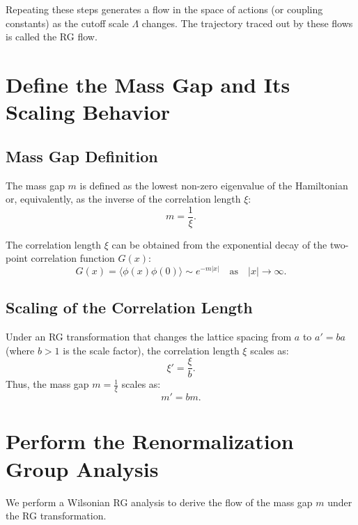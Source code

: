 Repeating these steps generates a flow in the space of actions (or coupling constants) as the cutoff scale \(\Lambda\) changes. The trajectory traced out by these flows is called the RG flow.



\section{Define the Mass Gap and Its Scaling Behavior}

\subsection{Mass Gap Definition}

The mass gap \(m\) is defined as the lowest non-zero eigenvalue of the Hamiltonian or, equivalently, as the inverse of the correlation length \(\xi\):
\begin{equation}
m = \frac{1}{\xi}.
\end{equation}

The correlation length \(\xi\) can be obtained from the exponential decay of the two-point correlation function \(G(x)\):
\begin{equation}
G(x) = \langle \phi(x) \phi(0) \rangle \sim e^{-m|x|} \quad \text{as} \quad |x| \to \infty.
\end{equation}

\subsection{Scaling of the Correlation Length}

Under an RG transformation that changes the lattice spacing from \(a\) to \(a' = b a\) (where \(b > 1\) is the scale factor), the correlation length \(\xi\) scales as:
\begin{equation}
\xi' = \frac{\xi}{b}.
\end{equation}
Thus, the mass gap \(m = \frac{1}{\xi}\) scales as:
\begin{equation}
m' = b m.
\end{equation}

\section{Perform the Renormalization Group Analysis}

We perform a Wilsonian RG analysis to derive the flow of the mass gap \(m\) under the RG transformation.

